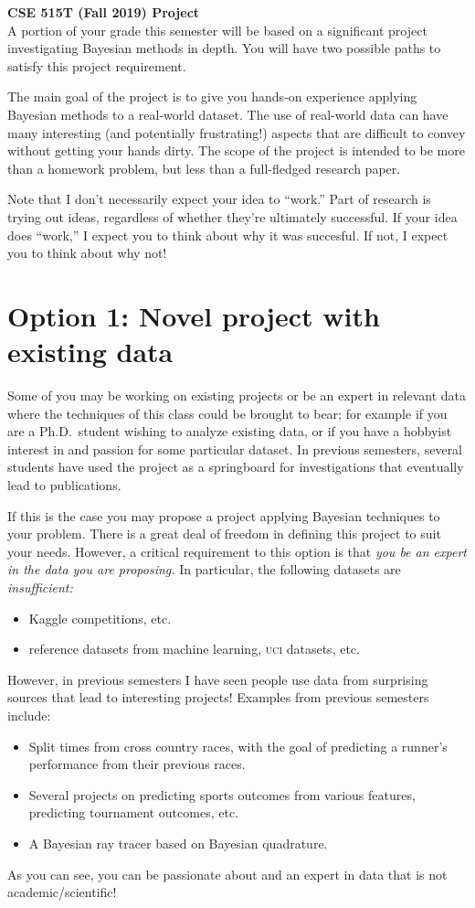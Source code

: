 \documentclass{article}
\newcommand{\acro}[1]{\textsc{\MakeLowercase{#1}}}
\begin{document}
{\large \textbf{CSE 515T (Fall 2019) Project}} \\

A portion of your grade this semester will be based on a significant project
investigating Bayesian methods in depth. You will have two possible paths to
satisfy this project requirement.

The main goal of the project is to give you hands-on experience applying
Bayesian methods to a real-world dataset.  The use of real-world data can have
many interesting (and potentially frustrating!) aspects that are difficult to
convey without getting your hands dirty.  The scope of the project is intended
to be more than a homework problem, but less than a full-fledged research paper.

Note that I don't necessarily expect your idea to ``work.''  Part of research is
trying out ideas, regardless of whether they're ultimately successful.  If your
idea does ``work,'' I expect you to think about why it was succesful.  If not, I
expect you to think about why not!

\clearpage

\section*{Option 1: Novel project with existing data}

Some of you may be working on existing projects or be an expert in relevant data
where the techniques of this class could be brought to bear; for example if you
are a Ph.D.\ student wishing to analyze existing data, or if you have a hobbyist
interest in and passion for some particular dataset. In previous semesters,
several students have used the project as a springboard for investigations that
eventually lead to publications.

If this is the case you may propose a project applying Bayesian techniques to
your problem. There is a great deal of freedom in defining this project to suit
your needs. However, a critical requirement to this option is that \emph{you be
  an expert in the data you are proposing.} In particular, the following
datasets are \emph{insufficient:}
\begin{itemize}
\item Kaggle competitions, etc.
\item reference datasets from machine learning, \acro{UCI} datasets, etc.
\end{itemize}

However, in previous semesters I have seen people use data from surprising
sources that lead to interesting projects! Examples from previous semesters
include:
\begin{itemize}
\item Split times from cross country races, with the goal of predicting a
  runner's performance from their previous races.
\item Several projects on predicting sports outcomes from various features,
  predicting tournament outcomes, etc.
\item
  A Bayesian ray tracer based on Bayesian quadrature.
\end{itemize}
As you can see, you can be passionate about and an expert in data that is not
academic/scientific!
\end{document}
